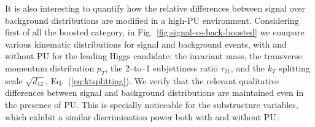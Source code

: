 It is also interesting to quantify how
the relative differences between
signal over background distributions are modified in a high-PU
environment.
%
Considering first of all the boosted category,
in Fig.~\ref{fig:signal-vs-back-boosted} we compare
various kinematic distributions for signal and background events,
with and without PU for the leading Higgs candidate: the invariant mass, the transverse
momentum distribution $p_T$,
     the 2--to--1 subjettiness ratio $\tau_{21}$, and 
     the $k_T$ splitting scale $\sqrt{d_{12}}$, Eq.~(\ref{eq:ktsplitting}).
      We verify that the relevant
      qualitative differences between signal
      and background distributions are maintained even in the presence of PU.
      This is specially noticeable for the substructure variables, which
      exhibit a similar discrimination power both with and without
      PU.
     

